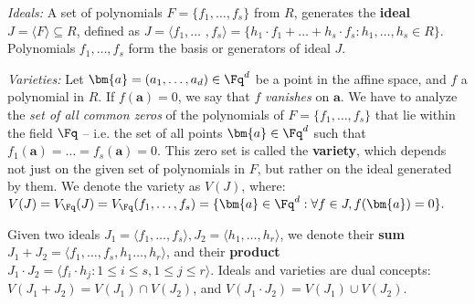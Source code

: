 
{\it Ideals:} A set of polynomials 
$F=\{f_1,\dots,f_s\}$ from $R$, generates the {\bf ideal} $J = \langle
F \rangle \subseteq R$, defined as $J = \langle f_1,\dots$ $, f_s \rangle = \{
h_1\cdot f_1 + \dots+h_s\cdot f_s:  h_1,\dots,h_s\in R\}$. 
Polynomials $f_1,\dots,f_s$ form the basis or generators of ideal $J$.

{\it Varieties:} Let $\bm{a} = (a_1,\dots,a_d) \in \Fq^d$ be a point in the affine
space, and $f$ a polynomial in $R$. If $f(\bm{a}) = 0$, we say
that $f$ {\it vanishes} on $\bm{a}$. We have to
analyze the {\it set of all common zeros} of the polynomials of $F =
\{f_1,\dots,f_s\}$  that lie within the field $\Fq$ -- i.e. the set of
all points $\bm{a} \in \Fq^d$ such that
$f_1(\bm{a})=\dots=f_s(\bm{a})=0$. This zero set is called the {\bf
  variety}, which depends not just on the given set of polynomials in
$F$, but rather on the ideal generated by them. We denote the variety as
$V(J)$, where: $ V(J)= V_{\Fq}(J) = V_{\Fq}(f_1,\dots,f_s) = \{\bm{a}
\in \Fq^d: \forall f \in J, f(\bm{a}) = 0\}.$


Given two ideals $J_1 = \langle f_1,\dots,f_s\rangle, J_2=\langle
h_1,\dots,h_r\rangle$, we denote their {\bf sum} $J_1 + J_2 = \langle
f_1,\dots,f_s,h_1\dots,h_r\rangle$, and their {\bf product} $J_1\cdot J_2 =
\langle f_i\cdot h_j: 1\leq i\leq s, 1\leq j\leq r\rangle$.
Ideals and varieties are dual concepts: $V(J_1 + J_2) = V(J_1) \cap
V(J_2)$, and $V(J_1\cdot J_2) = V(J_1) \cup V(J_2)$.

